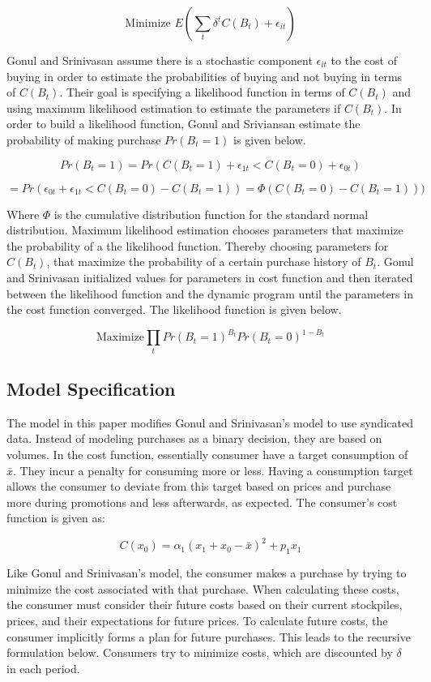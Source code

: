 \documentclass{article}
\begin{document}
$$\text{Minimize } E( \sum_t \delta^{t} C(B_t) + \epsilon_{it} )$$


Gonul and Srinivasan assume there is a stochastic component $\epsilon_{it}$ to the cost of buying in order to estimate the probabilities of buying and not buying in terms of $C(B_t)$. Their goal is specifying a likelihood function in terms of $C(B_t)$ and using maximum likelihood estimation to estimate the parameters if $C(B_t)$. In order to build a likelihood function, Gonul and Sriviansan estimate the probability of making purchase $Pr(B_t=1)$ is given below.

$$Pr(B_t=1) = Pr(C(B_t = 1) + \epsilon_{1t} < C(B_t = 0) + \epsilon_{0t} )$$ 

$$=  Pr(  \epsilon_{0t} + \epsilon_{1t} < C(B_t = 0) - C(B_t = 1) )  = \Phi(C(B_t = 0) - C(B_t = 1) ) ) $$

Where $\Phi$ is the cumulative distribution function for the standard normal distribution. Maximum likelihood estimation chooses parameters that maximize the probability of a the likelihood function. Thereby choosing parameters for $C(B_t)$, that maximize the probability of a certain purchase history of $B_t$. Gonul and Srinivasan initialized values for parameters in cost function and then iterated between the likelihood function and the dynamic program until the parameters in the cost function converged. The likelihood function is given below.

$$\text{Maximize} \prod_{t} Pr({B_t= 1})^{B_t} Pr(B_t=0)^{1-B_t} $$

\subsection{Model Specification}

The model in this paper modifies Gonul and Srinivasan's model to use syndicated data. Instead of modeling purchases as a binary decision, they are based on volumes. In the cost function, essentially consumer have a target consumption of $\bar{x}$. They incur a penalty for consuming more or less. Having a consumption target allows the consumer to deviate from this target based on prices and purchase more during promotions and less afterwards, as expected. The consumer's cost function is given as:

$$ C(x_0) = \alpha_1 (x_1 +x_0 - \bar{x})^2 + p_1 x_1 $$

Like Gonul and Srinivasan's model, the consumer makes a purchase by trying to minimize the cost associated with that purchase. When calculating these costs, the consumer must consider their future costs based on their current stockpiles, prices, and their expectations for future prices. To calculate future costs, the consumer implicitly forms a plan for future purchases.  This leads to the recursive formulation below. Consumers try to minimize costs, which are discounted by $\delta$ in each period.
\end{document}
